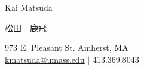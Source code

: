 \documentclass {vangogh500-resume}
\begin{document}
\begin{namesection} {Kai} {Matsuda}
	\begin{CJK}{UTF8}{min}
	松田　鹿飛 \\
	\end{CJK}
	973 E. Pleasant St. Amherst, MA \\ 
	\vspace{-3pt}
	\href{mailto:kmatsuda@umass.edu}{kmatsuda@umass.edu} $|$ 413.369.8043
\end {namesection}

\end{document}
